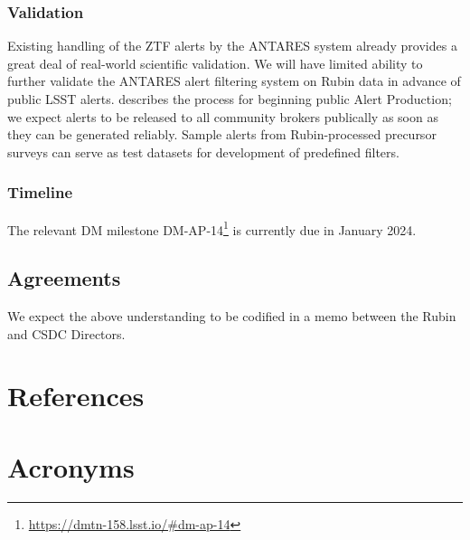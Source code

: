 \documentclass[DM,authoryear,toc]{lsstdoc}
\begin{document}
\subsubsection{Validation}

Existing handling of the ZTF alerts by the ANTARES system already provides a great deal of real-world scientific validation.
We will have limited ability to further validate the ANTARES alert filtering system on Rubin data in advance of public LSST alerts.
 describes the process for beginning public Alert Production; we expect alerts to be released to all community brokers publically as soon as they can be generated reliably.
Sample alerts from Rubin-processed precursor surveys can serve as test datasets for development of predefined filters.


\subsubsection{Timeline}

The relevant DM milestone DM-AP-14\footnote{\url{https://dmtn-158.lsst.io/\#dm-ap-14}} is currently due in January 2024.
\subsection{Agreements}

We expect the above understanding to be codified in a memo between the Rubin and CSDC Directors.

\appendix
\section{References} \label{sec:bib}
\renewcommand{\refname}{} %


\section{Acronyms} \label{sec:acronyms}

\end{document}
